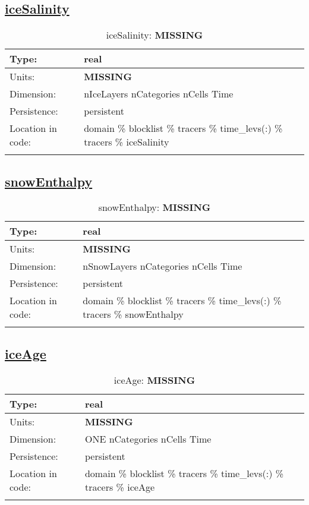 \subsection[iceSalinity]{\hyperref[sec:var_tab_tracers]{iceSalinity}}
\label{subsec:var_sec_tracers_iceSalinity}
\begin{center}
\begin{longtable}{| p{2.0in} | p{4.0in} |}
        \hline 
        Type: & real \\
        \hline 
        Units: & {\bf \color{red} MISSING} \\
        \hline 
        Dimension: & nIceLayers nCategories nCells Time \\
        \hline 
        Persistence: & persistent \\
        \hline 
         Location in code: & domain \% blocklist \% tracers \% time\_levs(:) \% tracers \% iceSalinity \\
         \hline 
    \caption{iceSalinity: {\bf \color{red} MISSING}}
\end{longtable}
\end{center}
\subsection[snowEnthalpy]{\hyperref[sec:var_tab_tracers]{snowEnthalpy}}
\label{subsec:var_sec_tracers_snowEnthalpy}
\begin{center}
\begin{longtable}{| p{2.0in} | p{4.0in} |}
        \hline 
        Type: & real \\
        \hline 
        Units: & {\bf \color{red} MISSING} \\
        \hline 
        Dimension: & nSnowLayers nCategories nCells Time \\
        \hline 
        Persistence: & persistent \\
        \hline 
         Location in code: & domain \% blocklist \% tracers \% time\_levs(:) \% tracers \% snowEnthalpy \\
         \hline 
    \caption{snowEnthalpy: {\bf \color{red} MISSING}}
\end{longtable}
\end{center}
\subsection[iceAge]{\hyperref[sec:var_tab_tracers]{iceAge}}
\label{subsec:var_sec_tracers_iceAge}
\begin{center}
\begin{longtable}{| p{2.0in} | p{4.0in} |}
        \hline 
        Type: & real \\
        \hline 
        Units: & {\bf \color{red} MISSING} \\
        \hline 
        Dimension: & ONE nCategories nCells Time \\
        \hline 
        Persistence: & persistent \\
        \hline 
         Location in code: & domain \% blocklist \% tracers \% time\_levs(:) \% tracers \% iceAge \\
         \hline 
    \caption{iceAge: {\bf \color{red} MISSING}}
\end{longtable}
\end{center}
